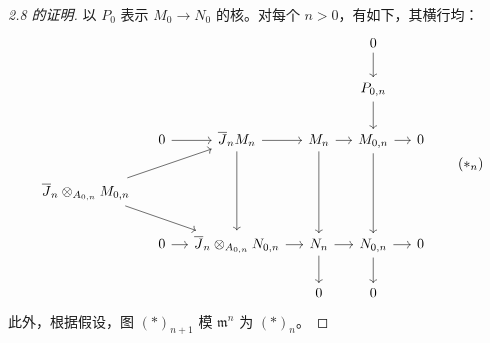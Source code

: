 \begin{proof}[2.8 的证明]
以 $P_0$ 表示 $M_0\to N_0$ 的核。对每个 $n>0$，有如下，其横行均：
\[
\begin{tikzcd}[column sep=small]
&&&&0\arrow[d]\\
&&&&P_{0,n}\arrow[d]\\
&0\arrow[r]&\overline J_nM_n\arrow[r]\arrow[dd]&M_n\arrow[r]\arrow[dd]&M_{0,n}\arrow[r]\arrow[dd]&0\\
\overline J_n\otimes_{A_{0,n}}M_{0,n}\arrow[urr]\arrow[drr]&&&&&\\
&0\arrow[r]&\overline J_n\otimes_{A_{0,n}}N_{0,n}\arrow[r]&N_n\arrow[r]\arrow[d]&N_{0,n}\arrow[r]\arrow[d]&0\\
&&&0&0
\end{tikzcd}\tag{$*_n$}
\]
此外，根据假设，图 $(*)_{n+1}$ 模 $\mathfrak m^n$ 为 $(*)_n$。


\end{proof}
